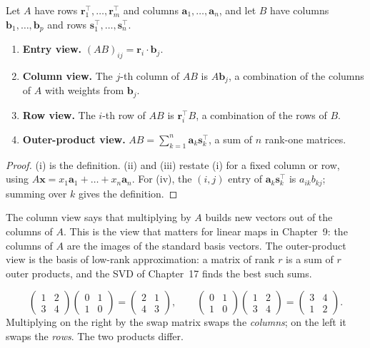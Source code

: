 \begin{proposition}\label{prop:fourviews}
Let $A$ have rows $\mathbf{r}_1^\top,\dots,\mathbf{r}_m^\top$ and columns $\mathbf{a}_1,\dots,\mathbf{a}_n$, and let $B$ have columns $\mathbf{b}_1,\dots,\mathbf{b}_p$ and rows $\mathbf{s}_1^\top,\dots,\mathbf{s}_n^\top$.
\begin{enumerate}[label=(\roman*)]
  \item \textbf{Entry view.} $(AB)_{ij}=\mathbf{r}_i\cdot\mathbf{b}_j$.
  \item \textbf{Column view.} The $j$-th column of $AB$ is $A\mathbf{b}_j$, a combination of the columns of $A$ with weights from $\mathbf{b}_j$.
  \item \textbf{Row view.} The $i$-th row of $AB$ is $\mathbf{r}_i^\top B$, a combination of the rows of $B$.
  \item \textbf{Outer-product view.} $AB=\sum_{k=1}^n\mathbf{a}_k\mathbf{s}_k^\top$, a sum of $n$ rank-one matrices.
\end{enumerate}
\end{proposition}

\begin{proof}
(i) is the definition. (ii) and (iii) restate (i) for a fixed column or row, using $A\mathbf{x}=x_1\mathbf{a}_1+\dots+x_n\mathbf{a}_n$. For (iv), the $(i,j)$ entry of $\mathbf{a}_k\mathbf{s}_k^\top$ is $a_{ik}b_{kj}$; summing over $k$ gives the definition.
\end{proof}

\begin{intuition}
The column view says that multiplying by $A$ builds new vectors out of the columns of $A$. This is the view that matters for linear maps in Chapter~9: the columns of $A$ are the images of the standard basis vectors. The outer-product view is the basis of low-rank approximation: a matrix of rank $r$ is a sum of $r$ outer products, and the SVD of Chapter~17 finds the best such sums.
\end{intuition}

\begin{example}
\[
\begin{pmatrix}1&2\\3&4\end{pmatrix}\begin{pmatrix}0&1\\1&0\end{pmatrix}=\begin{pmatrix}2&1\\4&3\end{pmatrix},\qquad
\begin{pmatrix}0&1\\1&0\end{pmatrix}\begin{pmatrix}1&2\\3&4\end{pmatrix}=\begin{pmatrix}3&4\\1&2\end{pmatrix}.
\]
Multiplying on the right by the swap matrix swaps the \emph{columns}; on the left it swaps the \emph{rows}. The two products differ.
\end{example}

